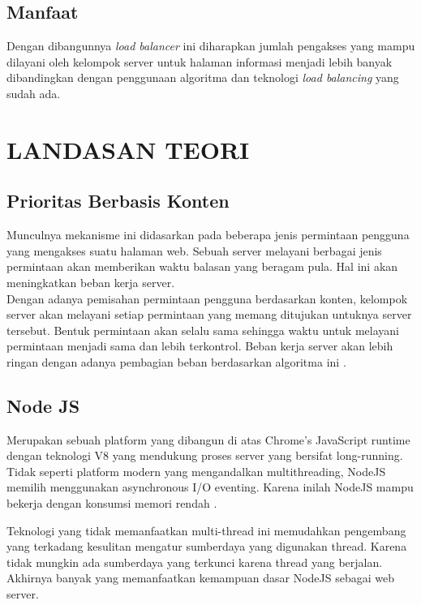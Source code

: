 \documentclass{ta-its}
\begin{document}
        \section{Manfaat}
			Dengan dibangunnya \emph{load balancer} ini diharapkan jumlah pengakses yang mampu dilayani oleh kelompok server untuk halaman informasi menjadi lebih banyak dibandingkan dengan penggunaan algoritma dan teknologi \emph{load balancing} yang sudah ada.

   \chapter{LANDASAN TEORI}
        \section{Prioritas Berbasis Konten}
			Munculnya mekanisme ini didasarkan pada beberapa jenis permintaan pengguna yang mengakses suatu halaman web. Sebuah server melayani berbagai jenis permintaan akan memberikan waktu balasan yang beragam pula. Hal ini akan meningkatkan beban kerja server. \\
			\indent Dengan adanya pemisahan permintaan pengguna berdasarkan konten, kelompok server akan melayani setiap permintaan yang memang ditujukan untuknya server tersebut. Bentuk permintaan akan selalu sama sehingga waktu untuk melayani permintaan menjadi sama dan lebih terkontrol. Beban kerja server akan lebih ringan dengan adanya pembagian beban berdasarkan algoritma ini \cite{paperAlgoritma}.

        \section{Node JS}
			Merupakan sebuah platform yang dibangun di atas Chrome's JavaScript runtime dengan teknologi V8 yang mendukung proses server yang bersifat long-running. Tidak seperti platform modern yang mengandalkan multithreading, NodeJS memilih menggunakan asynchronous I/O eventing. Karena inilah NodeJS mampu bekerja dengan konsumsi memori rendah \cite{webNodeJS}\cite{useNodeJS}.
			
			Teknologi yang tidak memanfaatkan multi-thread ini memudahkan pengembang yang terkadang kesulitan mengatur sumberdaya yang digunakan thread. Karena tidak mungkin ada sumberdaya yang terkunci karena thread yang berjalan. Akhirnya banyak yang memanfaatkan kemampuan dasar NodeJS sebagai web server.
			
\end{document}
